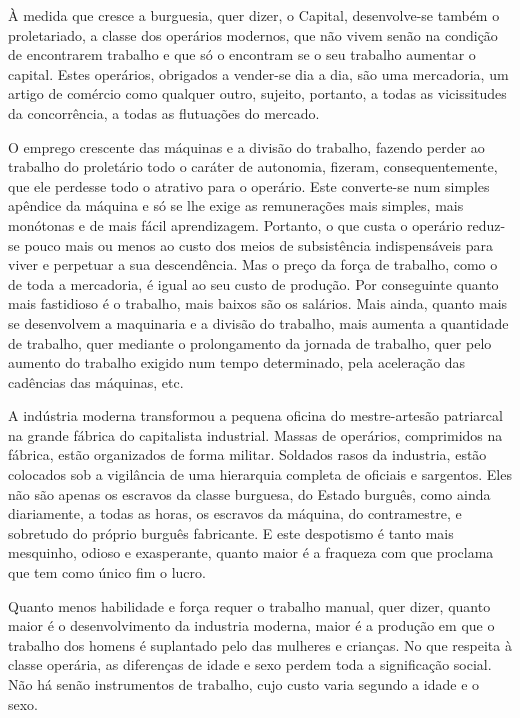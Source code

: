 À medida que cresce a burguesia, quer dizer, o Capital, desenvolve-se
também o proletariado, a classe dos operários modernos, que não vivem
senão na condição de encontrarem trabalho e que só o encontram se o
seu trabalho aumentar o capital. Estes operários, obrigados a
vender-se dia a dia, são uma mercadoria, um artigo de comércio como
qualquer outro, sujeito, portanto, a todas as vicissitudes da
concorrência, a todas as flutuações do mercado.

O emprego crescente das máquinas e a divisão do trabalho, fazendo
perder ao trabalho do proletário todo o caráter de autonomia, fizeram,
consequentemente, que ele perdesse todo o atrativo para o
operário. Este converte-se num simples apêndice da máquina e só se lhe
exige as remunerações mais simples, mais monótonas e de mais fácil
aprendizagem. Portanto, o que custa o operário reduz-se pouco mais ou
menos ao custo dos meios de subsistência indispensáveis para viver e
perpetuar a sua descendência. Mas o preço da força de trabalho, como o
de toda a mercadoria, é igual ao seu custo de produção. Por
conseguinte quanto mais fastidioso é o trabalho, mais baixos são os
salários. Mais ainda, quanto mais se desenvolvem a maquinaria e a
divisão do trabalho, mais aumenta a quantidade de trabalho, quer
mediante o prolongamento da jornada de trabalho, quer pelo aumento do
trabalho exigido num tempo determinado, pela aceleração das cadências
das máquinas, etc.

A indústria moderna transformou a pequena oficina do mestre-artesão
patriarcal na grande fábrica do capitalista industrial. Massas de
operários, comprimidos na fábrica, estão organizados de forma
militar. Soldados rasos da industria, estão colocados sob a vigilância
de uma hierarquia completa de oficiais e sargentos. Eles não são
apenas os escravos da classe burguesa, do Estado burguês, como ainda
diariamente, a todas as horas, os escravos da máquina, do
contramestre, e sobretudo do próprio burguês fabricante. E este
despotismo é tanto mais mesquinho, odioso e exasperante, quanto maior
é a fraqueza com que proclama que tem como único fim o lucro.

Quanto menos habilidade e força requer o trabalho manual, quer dizer,
quanto maior é o desenvolvimento da industria moderna, maior é a
produção em que o trabalho dos homens é suplantado pelo das mulheres e
crianças. No que respeita à classe operária, as diferenças de idade e
sexo perdem toda a significação social. Não há senão instrumentos de
trabalho, cujo custo varia segundo a idade e o sexo.

